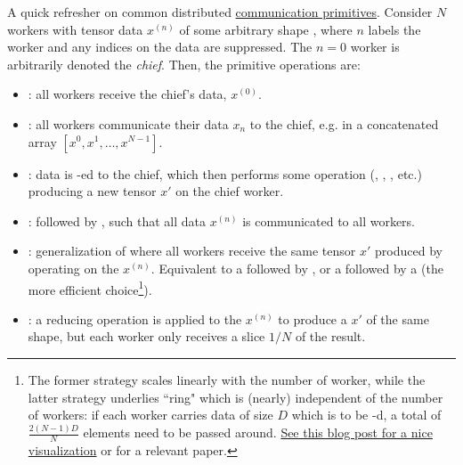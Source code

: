 \documentclass[11pt]{article}
\begin{document}
A quick refresher on common distributed
\href{https://docs.nvidia.com/deeplearning/nccl/user-guide/docs/usage/collectives.html}{communication
primitives}.  Consider $ N $ workers with tensor data $ x ^{ (n) }  $ of some arbitrary shape
, where $ n $ labels the worker and any indices on the data are suppressed. The $
n=0 $ worker is arbitrarily denoted the \textit{chief}.  Then, the primitive operations are:
\begin{itemize}
    \item {}: all workers receive  the chief's data, $ x ^{ (0) }  $.
    \item {}: all workers communicate their data $ x _{ n } $ to the chief, e.g. in a
        concatenated array $ [x ^{ 0 }, x ^{ 1 }, \ldots , x ^{ N-1 }] $.
    \item {}: data is -ed to the chief, which then performs some
        operation (, , , etc.) producing a new tensor $
        x' $ on the chief worker.
    \item {}:  followed by , such that all
        data $ x ^{ (n) } $ is communicated to all workers.
    \item {}: generalization of  where all
        workers receive the same tensor $ x' $ produced by operating on the $ x ^{ (n) } $.
        Equivalent to a  followed by , or a
         followed by a  (the more efficient
        choice\footnote{The former strategy scales linearly with the number of worker, while the
            latter strategy underlies ``ring"  which is (nearly) independent of
            the number of workers: if each worker carries data of size $ D $ which is to be
            -d, a total of $ \frac{ 2 \left ( N-1 \right )D }{ N } $ elements need to be passed around.
           \href{https://andrew.gibiansky.com/blog/machine-learning/baidu-allreduce/}{See this blog
                post for a nice visualization} or \cite{bandwidthOptimalAllReduce2009} for a
            relevant paper.\label{foot_all_reduce}}).
    \item {}: a reducing operation is applied to the $ x ^{ (n) } $ to produce
        a $ x' $ of the same shape, but each worker only receives a slice $ 1/N $ of the result.
\end{itemize}
\end{document}
